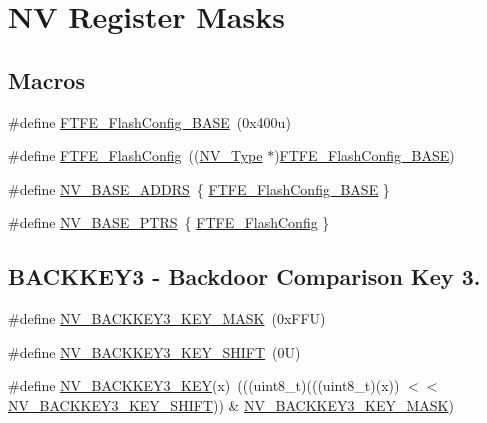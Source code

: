 \hypertarget{group___n_v___register___masks}{}\section{NV Register Masks}
\label{group___n_v___register___masks}
\subsection*{Macros}
\begin{DoxyCompactItemize}
\item 
\#define \mbox{\hyperlink{group___n_v___register___masks_ga10dc635084032a61ca68e3d242e3aaf0}{F\+T\+F\+E\+\_\+\+Flash\+Config\+\_\+\+B\+A\+SE}}~(0x400u)
\item 
\#define \mbox{\hyperlink{group___n_v___register___masks_ga834657fb01c008d200d4e0aaa7857a2f}{F\+T\+F\+E\+\_\+\+Flash\+Config}}~((\mbox{\hyperlink{struct_n_v___type}{N\+V\+\_\+\+Type}} $\ast$)\mbox{\hyperlink{group___n_v___register___masks_ga10dc635084032a61ca68e3d242e3aaf0}{F\+T\+F\+E\+\_\+\+Flash\+Config\+\_\+\+B\+A\+SE}})
\item 
\#define \mbox{\hyperlink{group___n_v___register___masks_ga59a94e9ecd6653c2a47bc205a8c0ba4c}{N\+V\+\_\+\+B\+A\+S\+E\+\_\+\+A\+D\+D\+RS}}~\{ \mbox{\hyperlink{group___n_v___register___masks_ga10dc635084032a61ca68e3d242e3aaf0}{F\+T\+F\+E\+\_\+\+Flash\+Config\+\_\+\+B\+A\+SE}} \}
\item 
\#define \mbox{\hyperlink{group___n_v___register___masks_ga1e44e66a8945b675dcebb6fbd6bdc85b}{N\+V\+\_\+\+B\+A\+S\+E\+\_\+\+P\+T\+RS}}~\{ \mbox{\hyperlink{group___n_v___register___masks_ga834657fb01c008d200d4e0aaa7857a2f}{F\+T\+F\+E\+\_\+\+Flash\+Config}} \}
\end{DoxyCompactItemize}
\subsection*{B\+A\+C\+K\+K\+E\+Y3 -\/ Backdoor Comparison Key 3.}
\begin{DoxyCompactItemize}
\item 
\#define \mbox{\hyperlink{group___n_v___register___masks_gabe9123bc8137627b30e4f75c757cfb95}{N\+V\+\_\+\+B\+A\+C\+K\+K\+E\+Y3\+\_\+\+K\+E\+Y\+\_\+\+M\+A\+SK}}~(0x\+F\+F\+U)
\item 
\#define \mbox{\hyperlink{group___n_v___register___masks_ga78b75e37d984596ddd9053d2125a78ff}{N\+V\+\_\+\+B\+A\+C\+K\+K\+E\+Y3\+\_\+\+K\+E\+Y\+\_\+\+S\+H\+I\+FT}}~(0\+U)
\item 
\#define \mbox{\hyperlink{group___n_v___register___masks_ga2fa5913563629cd7c8b509cc87421687}{N\+V\+\_\+\+B\+A\+C\+K\+K\+E\+Y3\+\_\+\+K\+EY}}(x)~(((uint8\+\_\+t)(((uint8\+\_\+t)(x)) $<$$<$ \mbox{\hyperlink{group___n_v___register___masks_ga78b75e37d984596ddd9053d2125a78ff}{N\+V\+\_\+\+B\+A\+C\+K\+K\+E\+Y3\+\_\+\+K\+E\+Y\+\_\+\+S\+H\+I\+FT}})) \& \mbox{\hyperlink{group___n_v___register___masks_gabe9123bc8137627b30e4f75c757cfb95}{N\+V\+\_\+\+B\+A\+C\+K\+K\+E\+Y3\+\_\+\+K\+E\+Y\+\_\+\+M\+A\+SK}})
\end{DoxyCompactItemize}
